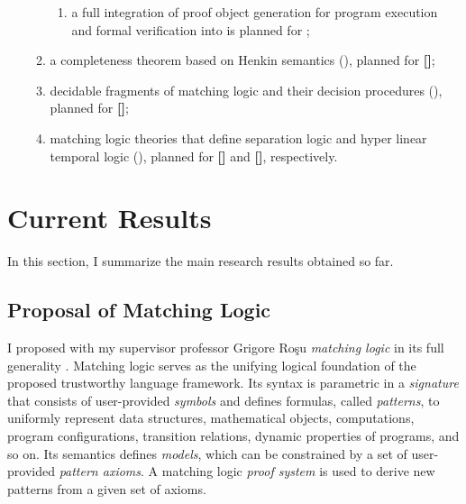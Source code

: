 \documentclass[11pt]{article}
\begin{document}
\begin{itemize}
\begin{enumerate}
\begin{enumerate}
\item a full integration of proof object generation for program execution and formal verification into \K is planned for \textbf{\plan{[PLDI2022]}};
\end{enumerate}
\item a completeness theorem based on Henkin semantics (), planned for \textbf{[]};
\item decidable fragments of matching logic and their decision procedures 
(), planned for \textbf{[]};
\item matching logic theories that define separation logic and hyper linear 
temporal logic (), planned for \textbf{[]} and \textbf{[]}, respectively.
\end{enumerate}
\end{itemize}

\section{Current Results}
\label{sec:current}

In this section, I summarize the main research results obtained so far. 

\subsection{Proposal of Matching Logic}
\label{sec:ml}

I proposed with my supervisor professor Grigore Ro\c{s}u \emph{matching logic}
in its full generality \cite{CR19}. 
Matching logic serves as the unifying logical foundation of the proposed 
trustworthy language framework. 
Its syntax is parametric in a \emph{signature} that consists of 
user-provided \emph{symbols} and defines formulas, called \emph{patterns}, to 
uniformly represent
data structures, mathematical objects, computations, program configurations,
transition relations, dynamic properties of programs, and so on. 
Its semantics defines \emph{models}, which can be constrained by
a set of user-provided \emph{pattern axioms}. 
A matching logic \emph{proof system} is used to derive new patterns from a 
given set of axioms. 
\end{document}
